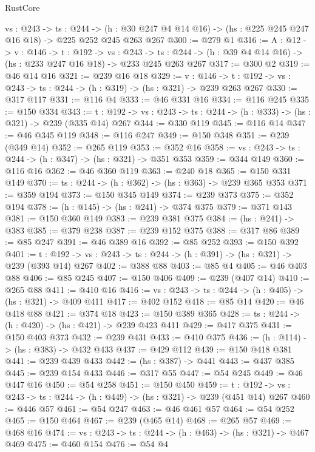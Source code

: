 \begin{lexlean}{RustCore}
\begin{coremodule}
  {vs : @243} ->
  {ts : @244} ->
  (h : @30 @247 @4 @14 @16) -> (hs : @225 @245 @247 @16 @18) -> @225 @252 @245 @263 @267
@300 := @279 @1
@316 := {A : @12} ->
  {v : @146} ->
  {t : @192} ->
  {vs : @243} ->
  {ts : @244} -> (h : @39 @4 @14 @16) -> (hs : @233 @247 @16 @18) -> @233 @245 @263 @267
@317 := @300 @2
@319 := @46 @14 @16
@321 := @239 @16 @18
@329 := {v : @146} ->
  {t : @192} -> {vs : @243} -> {ts : @244} -> (h : @319) -> (hs : @321) -> @239 @263 @267
@330 := @317 @117
@331 := @116 @4
@333 := @46 @331 @16
@334 := @116 @245
@335 := @150 @334
@343 := {t : @192} ->
  {vs : @243} -> {ts : @244} -> (h : @333) -> (hs : @321) -> @239 (@335 @14) @267
@344 := @330 @119
@345 := @116 @14
@347 := @46 @345 @119
@348 := @116 @247
@349 := @150 @348
@351 := @239 (@349 @14)
@352 := @265 @119
@353 := @352 @16
@358 := {vs : @243} -> {ts : @244} -> (h : @347) -> (hs : @321) -> @351 @353
@359 := @344 @149
@360 := @116 @16
@362 := @46 @360 @119
@363 := @240 @18
@365 := @150 @331 @149
@370 := {ts : @244} -> (h : @362) -> (hs : @363) -> @239 @365 @353
@371 := @359 @194
@373 := @150 @345 @149
@374 := @239 @373
@375 := @352 @194
@378 := (h : @145) -> (hs : @241) -> @374 @375
@379 := @371 @143
@381 := @150 @360 @149
@383 := @239 @381 @375
@384 := (hs : @241) -> @383
@385 := @379 @238
@387 := @239 @152 @375
@388 := @317 @86
@389 := @85 @247
@391 := @46 @389 @16
@392 := @85 @252
@393 := @150 @392
@401 := {t : @192} ->
  {vs : @243} -> {ts : @244} -> (h : @391) -> (hs : @321) -> @239 (@393 @14) @267
@402 := @388 @88
@403 := @85 @4
@405 := @46 @403 @88
@406 := @85 @245
@407 := @150 @406
@409 := @239 (@407 @14)
@410 := @265 @88
@411 := @410 @16
@416 := {vs : @243} -> {ts : @244} -> (h : @405) -> (hs : @321) -> @409 @411
@417 := @402 @152
@418 := @85 @14
@420 := @46 @418 @88
@421 := @374 @18
@423 := @150 @389 @365
@428 := {ts : @244} -> (h : @420) -> (hs : @421) -> @239 @423 @411
@429 := @417 @375
@431 := @150 @403 @373
@432 := @239 @431
@433 := @410 @375
@436 := (h : @114) -> (hs : @383) -> @432 @433
@437 := @429 @112
@439 := @150 @418 @381
@441 := @239 @439 @433
@442 := (hs : @387) -> @441
@443 := @437 @385
@445 := @239 @154 @433
@446 := @317 @55
@447 := @54 @245
@449 := @46 @447 @16
@450 := @54 @258
@451 := @150 @450
@459 := {t : @192} ->
  {vs : @243} -> {ts : @244} -> (h : @449) -> (hs : @321) -> @239 (@451 @14) @267
@460 := @446 @57
@461 := @54 @247
@463 := @46 @461 @57
@464 := @54 @252
@465 := @150 @464
@467 := @239 (@465 @14)
@468 := @265 @57
@469 := @468 @16
@474 := {vs : @243} -> {ts : @244} -> (h : @463) -> (hs : @321) -> @467 @469
@475 := @460 @154
@476 := @54 @4

\end{coremodule}
\end{lexlean}
